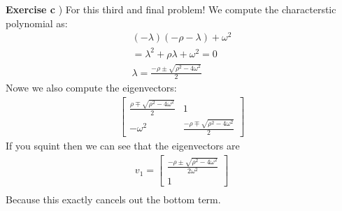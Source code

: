 \documentclass[12pt]{article}
\newenvironment{exercise}[1]{\vspace{.1in}\noindent\textbf{Exercise #1 \hspace{.05em}}}{}
\theoremstyle{definition}
\theoremstyle{remark}
\begin{document}
\begin{exercise}{4.1}
	c) For this third and final problem! We compute the characterstic polynomial as:
	\begin{align}
		(-\lambda)(-\rho-\lambda)+\omega^2 \\
		=\lambda^2+\rho\lambda+\omega^2=0  \\
		\lambda = \frac{-\rho \pm \sqrt{\rho^2-4\omega^2}}{2}
	\end{align}
	Nowe we also compute the eigenvectors:
	\begin{align}
		\begin{bmatrix}
			\frac{\rho\mp\sqrt{\rho^2-4\omega^2}}{2} & 1                                          \\
			-\omega^2                                & \frac{-\rho\mp \sqrt{\rho^2-4\omega^2}}{2}
		\end{bmatrix}
	\end{align}
	If you squint then we can see that the eigenvectors are
	\begin{align}
		v_1=%
		\begin{bmatrix}
			\frac{-\rho\pm\sqrt{\rho^2-4\omega^2}}{2\omega^2} \\
			1
		\end{bmatrix} \\
	\end{align}
	Because this exactly cancels out the bottom term.


\end{exercise}
\end{document}
